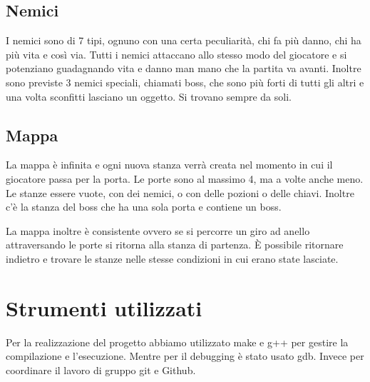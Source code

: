 \documentclass{article}
\begin{document}
\subsection{Nemici}
I nemici sono di 7 tipi, ognuno con una certa peculiarità, chi fa più danno, chi ha più vita e così via. Tutti i nemici attaccano allo stesso modo del giocatore e si potenziano guadagnando vita e danno man mano che la partita va avanti.
Inoltre sono previste 3 nemici speciali, chiamati boss, che sono più forti di tutti gli altri e una volta sconfitti lasciano un oggetto. Si trovano sempre da soli.

\subsection{Mappa}
La mappa è infinita e ogni nuova stanza verrà creata nel momento in cui il giocatore passa per la porta. Le porte sono al massimo 4, ma a volte anche meno.
Le stanze essere vuote, con dei nemici, o con delle pozioni o delle chiavi. Inoltre c'è la stanza del boss che ha una sola porta e contiene un boss.

La mappa inoltre è consistente ovvero se si percorre un giro ad anello attraversando le porte si ritorna alla stanza di partenza. È possibile ritornare indietro e trovare le stanze nelle stesse condizioni in cui erano state lasciate.

\section{Strumenti utilizzati}
Per la realizzazione del progetto abbiamo utilizzato make e g++ per gestire la compilazione e l'esecuzione. Mentre per il debugging è stato usato gdb. Invece per coordinare il lavoro di gruppo git e Github.
\end{document}

